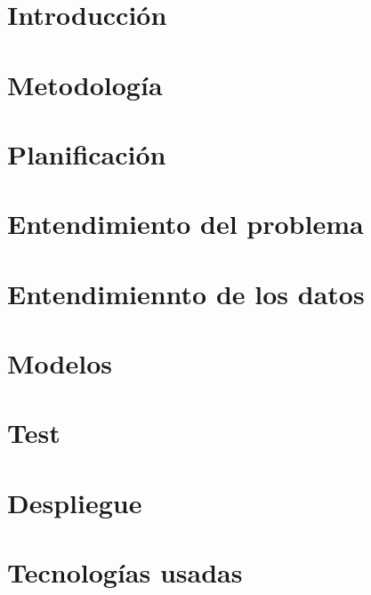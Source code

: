 \documentclass[openright,twoside,10pt]{book}
\begin{document}
\printglossary[title=Glosario de términos, toctitle=Glosario de términos]
\glsaddall
\clearpage

\printglossary[type=\acronymtype]

\chapter{Introducción}\label{cap.introduccion}



\chapter{Metodología}


\chapter{Planificación}
\label{cap.req-planificacion}

\chapter{Entendimiento del problema}


\chapter{Entendimiennto de los datos}


\chapter{Modelos}


\chapter{Test}


\chapter{Despliegue}



\chapter{Tecnologías usadas}

\end{document}
